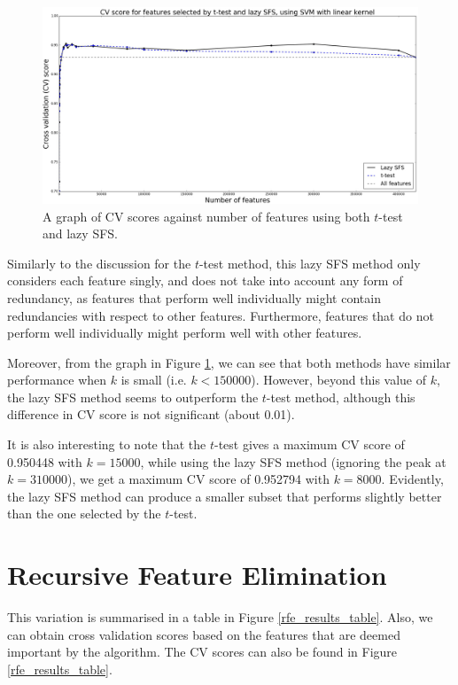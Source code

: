 \documentclass[12pt, twoside, a4paper]{report}
\begin{document}
\begin{figure}
\centering
\includegraphics[width=\textwidth]{images/t_test_and_lazy_sfs.jpeg}
\caption{A graph of CV scores against number of features using both $t$-test and lazy SFS.}
\label{body:t_test_and_lazy_sfs:graph}
\end{figure}

Similarly to the discussion for the $t$-test method, this lazy SFS method only considers each feature singly, and does not take into account any form of redundancy, as features that perform well individually might contain redundancies with respect to other features. Furthermore, features that do not perform well individually might perform well with other features.

Moreover, from the graph in Figure \ref{body:t_test_and_lazy_sfs:graph}, we can see that both methods have similar performance when $k$ is small (i.e. $k<150000$). However, beyond this value of $k$, the lazy SFS method seems to outperform the $t$-test method, although this difference in CV score is not significant (about 0.01).

It is also interesting to note that the $t$-test gives a maximum CV score of 0.950448 with $k=15000$, while using the lazy SFS method (ignoring the peak at $k=310000$), we get a maximum CV score of 0.952794 with $k=8000$. Evidently, the lazy SFS method can produce a smaller subset that performs slightly better than the one selected by the $t$-test.


\section{Recursive Feature Elimination}

This variation is summarised in a table in Figure \ref{rfe_results_table}. Also, we can obtain cross validation scores based on the features that are deemed important by the algorithm. The CV scores can also be found in Figure \ref{rfe_results_table}.
\end{document}
